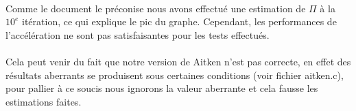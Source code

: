 		\paragraph{}Comme le document le préconise nous avons effectué une estimation de $\Pi$ à la $10^{e}$ itération, ce qui explique le pic du graphe. Cependant, les performances de l'accélération ne sont pas satisfaisantes pour les tests effectués.
		\paragraph{}Cela peut venir du fait que notre version de Aitken n'est pas correcte, en effet des résultats aberrants se produisent sous certaines conditions (voir fichier aitken.c), pour pallier à ce soucis nous ignorons la valeur aberrante et cela fausse les estimations faites.
